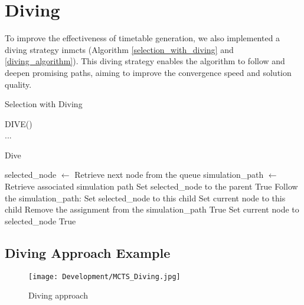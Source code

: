 \section{Diving}\label{sec:diving}

To improve the effectiveness of timetable generation, we also implemented a diving strategy in\ac{mcts} (Algorithm \ref{selection_with_diving} and \ref{diving_algorithm}). This diving strategy enables the algorithm to follow and deepen promising paths, aiming to improve the convergence speed and solution quality.

\begin{algorithm}
\caption{Selection with Diving}\label{selection_with_diving}
\begin{algorithmic}[1]
		\State DIVE()
	\EndIf
\\
	\State ... 	
	\\
\EndProcedure
\end{algorithmic}
\end{algorithm}

\begin{algorithm}
\caption{Dive}\label{diving_algorithm}
\begin{algorithmic}[1]
		\State selected\_node $\gets$ Retrieve next node from the queue 
		\State simulation\_path $\gets$ Retrieve associated simulation path
            		\State Set selected\_node to the parent
            		\State \Return True
 			\State Follow the simulation\_path:
					\State Set selected\_node to this child
					\State Set current node to this child
					\State Remove the assignment from the simulation\_path
					\State \Return True
				\EndIf
			\EndFor
		\Else
			\State Set current node to selected\_node
               		\State \Return True
            	\EndIf
\EndFunction
\end{algorithmic}
\end{algorithm}

\subsection{Diving Approach Example}


\begin{figure}
      \centering
      \texttt{[image: Development/MCTS\_Diving.jpg]}
      \caption[Diving approach]
      {Diving approach}
      \label{fig:diving}
\end{figure}


